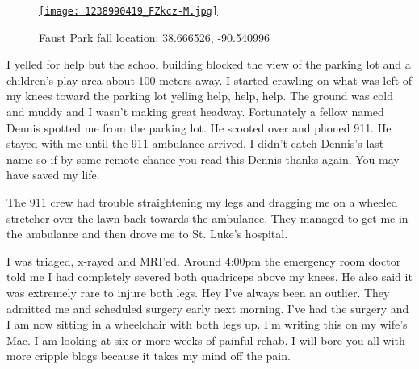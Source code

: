 \captionsetup[figure]{labelformat=empty}
\begin{figure}[htbp]
\centering
\href{http://conceptcontrol.smugmug.com/Themes/Diaries/SmugShots/16038397\_4tPwa}{\texttt{[image: 1238990419\_FZkcz-M.jpg]}}
\caption{Faust  Park fall location: 38.666526,  -90.540996}
\label{fig:1159X0}
\end{figure}


I yelled for help but the school building blocked the view of the
parking lot and a children's play area about 100 meters away. I started
crawling on what was left of my knees toward the parking lot yelling
help, help, help. The ground was cold and muddy and I wasn't making
great headway. Fortunately a fellow named Dennis spotted me from the
parking lot. He scooted over and phoned 911. He stayed with me until the
911 ambulance arrived. I didn't catch Dennis's last name so if by some
remote chance you read this Dennis thanks again. You may have saved my
life.

The 911 crew had trouble straightening my legs and dragging me on a
wheeled stretcher over the lawn back towards the ambulance. They managed
to get me in the ambulance and then drove me to St. Luke's hospital.

I was triaged, x-rayed and MRI'ed. Around 4:00pm the emergency room
doctor told me I had completely severed both quadriceps above my knees.
He also said it was extremely rare to injure both legs. Hey I've always
been an outlier. They admitted me and scheduled surgery early next
morning. I've had the surgery and I am now sitting in a wheelchair with
both legs up. I'm writing this on my wife's Mac. I am looking at six or
more weeks of painful rehab. I will bore you all with more cripple blogs
because it takes my mind off the pain.




%